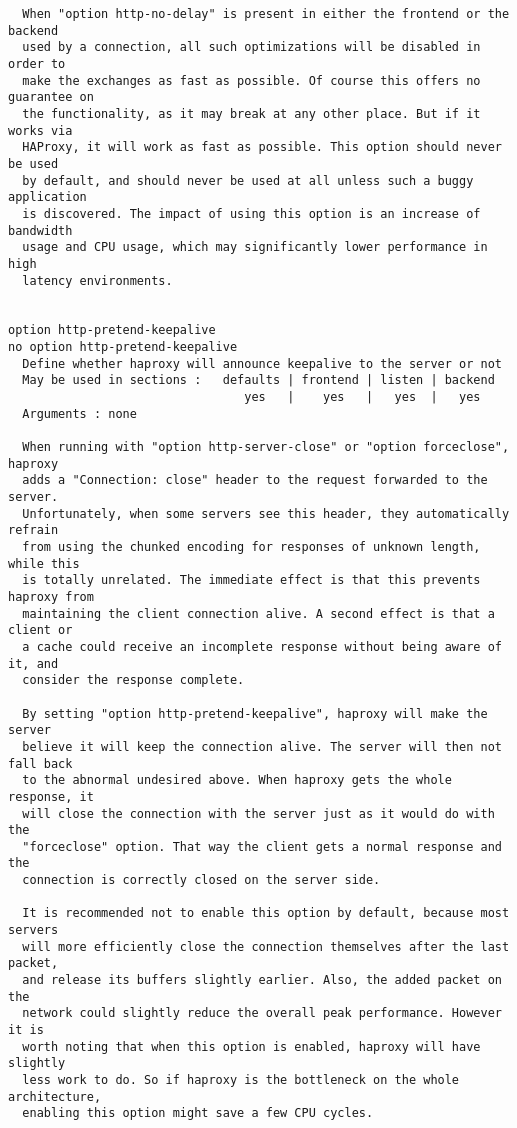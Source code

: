 \begin{verbatim}
  When "option http-no-delay" is present in either the frontend or the backend
  used by a connection, all such optimizations will be disabled in order to
  make the exchanges as fast as possible. Of course this offers no guarantee on
  the functionality, as it may break at any other place. But if it works via
  HAProxy, it will work as fast as possible. This option should never be used
  by default, and should never be used at all unless such a buggy application
  is discovered. The impact of using this option is an increase of bandwidth
  usage and CPU usage, which may significantly lower performance in high
  latency environments.


option http-pretend-keepalive
no option http-pretend-keepalive
  Define whether haproxy will announce keepalive to the server or not
  May be used in sections :   defaults | frontend | listen | backend
                                 yes   |    yes   |   yes  |   yes
  Arguments : none

  When running with "option http-server-close" or "option forceclose", haproxy
  adds a "Connection: close" header to the request forwarded to the server.
  Unfortunately, when some servers see this header, they automatically refrain
  from using the chunked encoding for responses of unknown length, while this
  is totally unrelated. The immediate effect is that this prevents haproxy from
  maintaining the client connection alive. A second effect is that a client or
  a cache could receive an incomplete response without being aware of it, and
  consider the response complete.

  By setting "option http-pretend-keepalive", haproxy will make the server
  believe it will keep the connection alive. The server will then not fall back
  to the abnormal undesired above. When haproxy gets the whole response, it
  will close the connection with the server just as it would do with the
  "forceclose" option. That way the client gets a normal response and the
  connection is correctly closed on the server side.

  It is recommended not to enable this option by default, because most servers
  will more efficiently close the connection themselves after the last packet,
  and release its buffers slightly earlier. Also, the added packet on the
  network could slightly reduce the overall peak performance. However it is
  worth noting that when this option is enabled, haproxy will have slightly
  less work to do. So if haproxy is the bottleneck on the whole architecture,
  enabling this option might save a few CPU cycles.


\end{verbatim}
